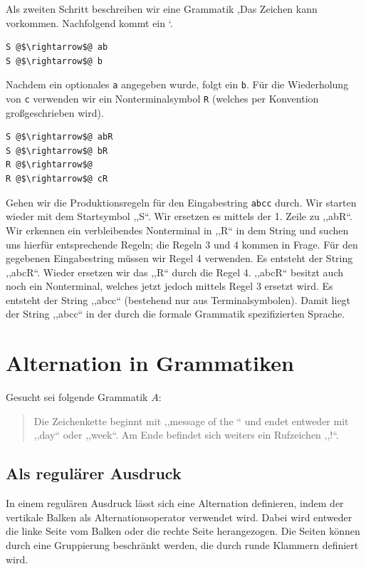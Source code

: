 Als zweiten Schritt beschreiben wir eine Grammatik ,Das Zeichen  kann vorkommen. Nachfolgend kommt ein `.
\begin{lstlisting}
S @$\rightarrow$@ ab
S @$\rightarrow$@ b
\end{lstlisting}

Nachdem ein optionales \texttt{a} angegeben wurde, folgt ein \texttt{b}. Für die Wiederholung von \texttt{c} verwenden wir ein Nonterminalsymbol \texttt{R} (welches per Konvention großgeschrieben wird).
\begin{lstlisting}
S @$\rightarrow$@ abR
S @$\rightarrow$@ bR
R @$\rightarrow$@
R @$\rightarrow$@ cR
\end{lstlisting}

Gehen wir die Produktionsregeln für den Eingabestring \texttt{abcc} durch. Wir starten wieder mit dem Startsymbol ,,S``. Wir ersetzen es mittels der 1. Zeile zu ,,abR``. Wir erkennen ein verbleibendes Nonterminal in ,,R`` in dem String und suchen uns hierfür entsprechende Regeln; die Regeln 3 und 4 kommen in Frage. Für den gegebenen Eingabestring müssen wir Regel 4 verwenden. Es entsteht der String ,,abcR``. Wieder ersetzen wir das ,,R`` durch die Regel 4. ,,abcR`` besitzt auch noch ein Nonterminal, welches jetzt jedoch mittels Regel 3 ersetzt wird. Es entsteht der String ,,abcc`` (bestehend nur aus Terminalsymbolen). Damit liegt der String ,,abcc`` in der durch die formale Grammatik spezifizierten Sprache.

\section{Alternation in Grammatiken}
%
Gesucht sei folgende Grammatik $A$:
\begin{quote}
  Die Zeichenkette beginnt mit ,,message of the `` und endet entweder mit ,,day`` oder ,,week``. Am Ende befindet sich weiters ein Rufzeichen ,,{!}``.
\end{quote}

\subsection{Als regulärer Ausdruck}
%
In einem regulären Ausdruck lässt sich eine Alternation definieren, indem der vertikale Balken als Alternationsoperator verwendet wird. Dabei wird entweder die linke Seite vom Balken oder die rechte Seite herangezogen. Die Seiten können durch eine Gruppierung beschränkt werden, die durch runde Klammern definiert wird.

